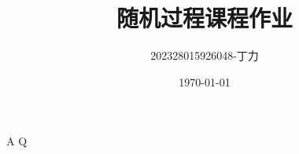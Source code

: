 \documentclass[a4,10pt]{ctexart}
\begin{document}
\title{随机过程课程作业}
\author{202328015926048-丁力}
\date{\today}
\maketitle
\tableofcontents
\newpage
{}
\newpage



\begin{ti}{A}{}
Q
\end{ti}
    






              

              

        
    
    
        
    
    
        
    
\end{document}
